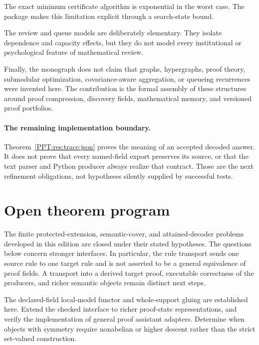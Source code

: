 The exact minimum certificate algorithm is exponential in the worst case. The package makes this limitation explicit through a search-state bound.

The review and queue models are deliberately elementary. They isolate dependence and capacity effects, but they do not model every institutional or psychological feature of mathematical review.

Finally, the monograph does not claim that graphs, hypergraphs, proof theory, submodular optimization, covariance-aware aggregation, or queueing recurrences were invented here. The contribution is the formal assembly of these structures around proof compression, discovery fields, mathematical memory, and versioned proof portfolios.


\paragraph{The remaining implementation boundary.} Theorem~\ref{PPT:res:trace:json} proves the meaning of an accepted decoded answer. It does not prove that every named-field export preserves its source, or that the text parser and Python producer always realize that contract. Those are the next refinement obligations, not hypotheses silently supplied by successful tests.

\section{Open theorem program}
\label{PPT:sec:old28}

The finite protected-extension, semantic-cover, and attained-decoder problems developed in this edition are closed under their stated hypotheses. The questions below concern stronger interfaces. In particular, the rule transport sends one source rule to one target rule and is not asserted to be a general equivalence of proof fields. A transport into a derived target proof, executable correctness of the producers, and richer semantic objects remain distinct next steps.


\begin{PPTproblem}
\label{PPT:res:28:1}
The declared-field local-model functor and whole-support gluing are established here. Extend the checked interface to richer proof-state representations, and verify the implementation of general proof assistant adapters. Determine when objects with symmetry require nonabelian or higher descent rather than the strict set-valued construction.
\end{PPTproblem}

